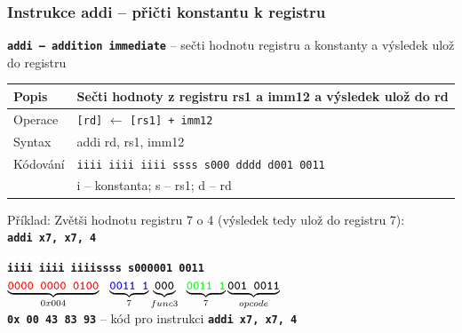 \begin{frame}
\frametitle{Instrukce addi -- přičti konstantu k registru}

\textbf{\texttt{addi -- addition immediate}} -- sečti hodnotu registru a konstanty a výsledek ulož do registru

\bigskip

\begin{tabular}{|l|l|}\hline
Popis & Sečti hodnoty z registru rs1 a imm12 a výsledek ulož do rd \\ \hline
Operace & \texttt{[rd]} $\leftarrow$ \texttt{[rs1] + imm12} \\ \hline
Syntax & addi rd, rs1, imm12 \\ \hline
Kódování & \texttt{iiii iiii iiii ssss s000 dddd d001 0011} \\ 
 & i -- konstanta; s -- rs1; d -- rd \\ \hline
\end{tabular}

\bigskip

Příklad: Zvětši hodnotu registru 7 o 4 (výsledek tedy ulož do registru 7):\\
\textbf{\texttt{addi x7, x7, 4}}

\textbf{\texttt{\color{red}iiii iiii iiii}}\phantom{xx}\textbf{\texttt{\color{blue}ssss s}}\hspace{0.1cm}\textbf{\texttt{000\hspace{0.05cm}001 0011}}\\
$\underbrace{\textbf{\texttt{\color{red}0000 0000 0100}}}_{0x004}\texttt{ }\underbrace{\textbf{\texttt{\color{blue}0011 1}}}_{7}\underbrace{\textbf{\texttt{000}}}_{func3}\phantom{i}\underbrace{\textbf{\texttt{\color{green}0011 1}}}_{7}\underbrace{\textbf{\texttt{001 0011}}}_{opcode}$\\

\textbf{\texttt{0x 00 43 83 93}} -- kód pro instrukci \textbf{\texttt{addi x7, x7, 4}}


\end{frame}


